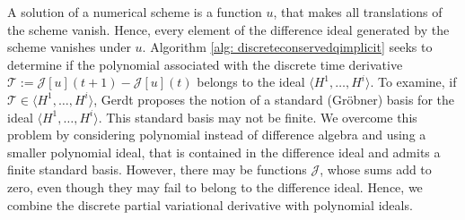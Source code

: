 \documentclass[manuscript]{acmart}
\newcommand{\1}{{\chi}}
\numberwithin{equation}{section}
\theoremstyle{thmlemcorr}
\numberwithin{theorem}{section}
\theoremstyle{thmlemcorr*}
\theoremstyle{defi}
\theoremstyle{remexample}
\theoremstyle{ass}
\begin{document}
A solution of a numerical scheme is a function $u$, that makes all translations of the scheme vanish. Hence, every element of the difference ideal generated by the scheme vanishes under $u$.
Algorithm \ref{alg: discreteconservedqimplicit} seeks to determine if the polynomial associated with the discrete time derivative $\mathcal{T}:=\mathcal{J}[u](t+1)-\mathcal{J}[u](t)$ belongs to the ideal $\langle H^1,\ldots,H^i\rangle$. To examine, if $\mathcal{T}\in\langle H^1,\ldots,H^i\rangle$, Gerdt proposes the notion of a standard (Gr{\"o}bner) basis for the ideal $\langle H^1,\ldots,H^i\rangle$. This standard basis may not be finite. We overcome this problem by considering polynomial instead of difference algebra and using a smaller polynomial ideal, that is contained in the difference ideal and admits a finite standard basis.
However, there may be functions $\mathcal{J}$, whose sums add to zero, even though they may fail to belong to the difference ideal. Hence, we combine the discrete partial variational derivative with polynomial ideals.
\end{document}
